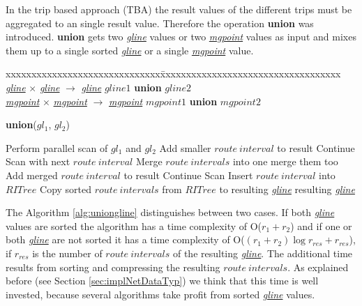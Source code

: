 \documentclass[a4paper]{article}
\newcommand{\op}[1]{\textbf{#1}}
\newcommand{\dt}[1]{\textsl{\underline{#1}}}
\begin{document}
In the trip based approach (TBA) the result values of the different trips must be
aggregated to an single result value. Therefore the operation \op{union} was
introduced. \op{union} gets two \dt{gline} values or two \dt{mgpoint} values as
input and mixes them up to a single sorted \dt{gline} or a single \dt{mgpoint}
value.
\begin{tabbing}
xxxxxxxxxxxxxxxxxxxxxxxxxxxxxx\=xxxxxxxxxxxxxxxxxxxxxxxxxxxxxxxxxxx\kill
\dt{gline} $\times$ \dt{gline} $\rightarrow$ \dt{gline} \> $gline1$ \op{union} $gline2$ \\
\dt{mgpoint} $\times$ \dt{mgpoint} $\rightarrow$ \dt{mgpoint} \> $mgpoint1$ \op{union} $mgpoint2$\\
\end{tabbing}
\begin{algorithm}[H]
  \caption{\op{union}($gl_1$, $gl_2$)}
  \label{alg:uniongline}
  \begin{algorithmic}
      \STATE Perform parallel scan of $gl_1$ and $gl_2$
         \STATE Add smaller $route\ interval$ to result
         \STATE Continue Scan with next $route\ interval$
      \ELSE
          \STATE Merge $route\ intervals$ into one
            \STATE merge them too
          \ENDIF
          \STATE Add merged $route\ interval$ to result
          \STATE Continue Scan
      \ENDIF
    \ELSE
        \STATE Insert $route\ interval$ into $RITree$
      \ENDFOR
      \STATE Copy sorted $route\ intervals$ from $RITree$ to resulting \dt{gline}
    \ENDIF
    \RETURN resulting \dt{gline}
  \end{algorithmic}
\end{algorithm}
The Algorithm \ref{alg:uniongline} distinguishes between two cases.
If both \dt{gline} values are sorted the algorithm has a time complexity of
O($r_1 + r_2$) and if one or both \dt{gline} are not sorted it has a time
complexity of O($(r_1 + r_2) \log r_{res} + r_{res}$), if $r_{res}$ is the
number of $route\ intervals$ of the resulting \dt{gline}. The additional
time results from sorting and compressing the resulting $route\ intervals$. As
explained before (see Section \ref{sec:implNetDataTyp}) we think that this time
is well invested, because several algorithms take profit from sorted \dt{gline}
values.
\end{document}
